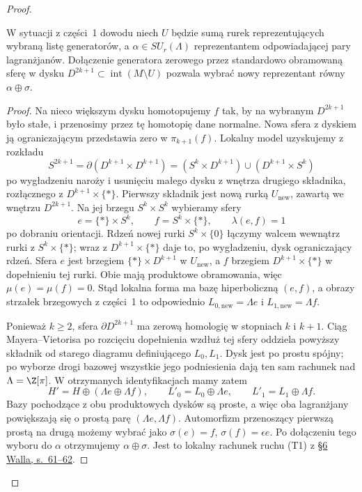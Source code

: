 \begin{proof}
\begin{lemat}
\label{lem:wall-odd-t1-22}
W sytuacji z części~1 dowodu niech $U$ będzie
sumą rurek reprezentujących wybraną listę
generatorów, a $\alpha\in SU_r(\Lambda)$
reprezentantem odpowiadającej pary lagranżjanów.
Dołączenie generatora zerowego przez standardowo
obramowaną sferę w dysku $D^{2k+1}\subset
\operatorname{int}(M\setminus U)$ pozwala wybrać
nowy reprezentant równy $\alpha\oplus\sigma$.
\end{lemat}
\begin{proof}
Na nieco większym dysku homotopujemy $f$ tak,
by na wybranym $D^{2k+1}$ było stałe, i przenosimy
przez tę homotopię dane normalne. Nowa sfera
z dyskiem ją ograniczającym przedstawia zero
w $\pi_{k+1}(f)$.
Lokalny model uzyskujemy z rozkładu
\[
 S^{2k+1}=\partial(D^{k+1}\times D^{k+1})
  =(S^k\times D^{k+1})\cup
    (D^{k+1}\times S^k)
\]
po wygładzeniu naroży i usunięciu małego dysku
z wnętrza drugiego składnika, rozłącznego z
$D^{k+1}\times\{*\}$. Pierwszy składnik
jest nową rurką $U_{\mathrm{new}}$, zawartą we
wnętrzu $D^{2k+1}$. Na jej brzegu
$S^k\times S^k$ wybieramy sfery
\[
 e=\{*\}\times S^k,\qquad
 f=S^k\times\{*\},
 \qquad\lambda(e,f)=1
\]
po dobraniu orientacji. Rdzeń nowej rurki
$S^k\times\{0\}$ łączymy walcem wewnątrz rurki
z $S^k\times\{*\}$; wraz z
$D^{k+1}\times\{*\}$ daje to, po wygładzeniu,
dysk ograniczający rdzeń.
Sfera $e$ jest brzegiem $\{*\}\times D^{k+1}$
w $U_{\mathrm{new}}$, a $f$ brzegiem
$D^{k+1}\times\{*\}$ w dopełnieniu tej rurki.
Obie mają produktowe obramowania, więc
$\mu(e)=\mu(f)=0$. Stąd lokalna forma ma bazę
hiperboliczną $(e,f)$, a obrazy strzałek
brzegowych z części~1 to odpowiednio
$L_{0,\mathrm{new}}=\Lambda e$ i
$L_{1,\mathrm{new}}=\Lambda f$.

Ponieważ $k\geq2$, sfera $\partial D^{2k+1}$
ma zerową homologię w stopniach $k$ i $k+1$.
Ciąg Mayera--Vietorisa po rozcięciu dopełnienia
wzdłuż tej sfery oddziela powyższy składnik
od starego diagramu definiującego $L_0,L_1$.
Dysk jest po prostu spójny; po wyborze drogi
bazowej wszystkie jego podniesienia dają ten
sam rachunek nad $\Lambda=\Z[\pi]$.
W otrzymanych identyfikacjach mamy zatem
\[
 H'=H\oplus(\Lambda e\oplus\Lambda f),\qquad
 L'_0=L_0\oplus\Lambda e,\qquad
 L'_1=L_1\oplus\Lambda f.
\]
Bazy pochodzące z obu produktowych dysków są
proste, a więc oba lagranżjany powiększają się
o prostą parę $(\Lambda e,\Lambda f)$.
Automorfizm przenoszący pierwszą prostą na drugą
możemy wybrać jako
$\sigma(e)=f$, $\sigma(f)=\epsilon e$.
Po dołączeniu tego wyboru do $\alpha$ otrzymujemy
$\alpha\oplus\sigma$.
Jest to lokalny rachunek ruchu (T1) z
\href{https://www.maths.ed.ac.uk/~v1ranick/books/scm.pdf}
{§6 Walla, s.~61--62}.
\end{proof}


\end{proof}
